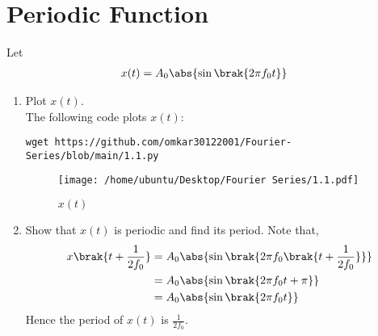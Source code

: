 \documentclass[journal,12pt,twocolumn]{IEEEtran}
\renewcommand\thesection{\arabic{section}}
\begin{document}
\section{Periodic Function}
Let 
\begin{align}
x(t) &= A_0\abs{\sin\brak{2\pi f_0 t}}
\label{eq:10-orig-diff-def}
\end{align}
\begin{enumerate}[label=\thesection.\arabic*
,ref=\thesection.\theenumi]
\item Plot $x(t)$. \\
\solution
The following code plots $x(t)$:
\begin{lstlisting}
wget https://github.com/omkar30122001/Fourier-Series/blob/main/1.1.py
\end{lstlisting}
\begin{figure}[!htp]
	\texttt{[image: /home/ubuntu/Desktop/Fourier Series/1.1.pdf]}
	\caption{$x(t)$}
	\label{fig:xt}
\end{figure}
\item Show that $x(t)$ is periodic and find its period.
\solution Note that,
\begin{align}
	x\brak{t+\frac{1}{2f_0}} &= A_0\abs{\sin\brak{2\pi f_0\brak{t + \frac{1}{2f_0}}}} \\
	&= A_0\abs{\sin\brak{2\pi f_0t + \pi}} \\
	&= A_0\abs{\sin\brak{2\pi f_0t}}
\end{align}
Hence the period of $x(t)$ is $\frac{1}{2f_0}$.
\end{enumerate}
\end{document}
